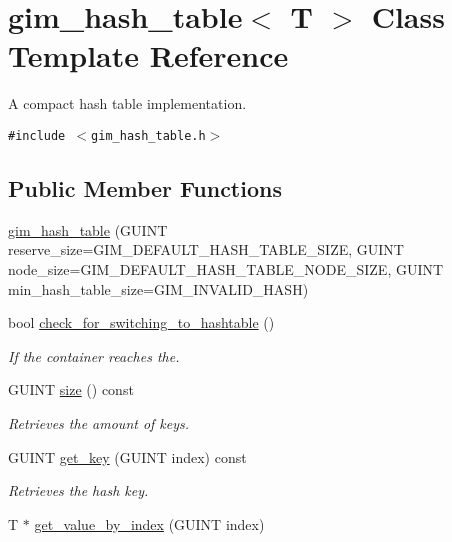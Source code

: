 \hypertarget{classgim__hash__table}{
\section{gim\_\-hash\_\-table$<$ T $>$ Class Template Reference}
\label{classgim__hash__table}
}
A compact hash table implementation.  


{\tt \#include $<$gim\_\-hash\_\-table.h$>$}

\subsection*{Public Member Functions}
\begin{CompactItemize}
\item 
\hyperlink{classgim__hash__table_efe21c907c69c8077ec0886aaa778f6f}{gim\_\-hash\_\-table} (GUINT reserve\_\-size=GIM\_\-DEFAULT\_\-HASH\_\-TABLE\_\-SIZE, GUINT node\_\-size=GIM\_\-DEFAULT\_\-HASH\_\-TABLE\_\-NODE\_\-SIZE, GUINT min\_\-hash\_\-table\_\-size=GIM\_\-INVALID\_\-HASH)
\item 
\hypertarget{classgim__hash__table_ba33eeb9b5aa00b0d8a002c549b71ed3}{
bool \hyperlink{classgim__hash__table_ba33eeb9b5aa00b0d8a002c549b71ed3}{check\_\-for\_\-switching\_\-to\_\-hashtable} ()}
\label{classgim__hash__table_ba33eeb9b5aa00b0d8a002c549b71ed3}

\begin{CompactList}\small\item\em If the container reaches the. \item\end{CompactList}\item 
\hypertarget{classgim__hash__table_a24edf41f1a5f7ee28f6d1f12e3922c3}{
GUINT \hyperlink{classgim__hash__table_a24edf41f1a5f7ee28f6d1f12e3922c3}{size} () const }
\label{classgim__hash__table_a24edf41f1a5f7ee28f6d1f12e3922c3}

\begin{CompactList}\small\item\em Retrieves the amount of keys. \item\end{CompactList}\item 
\hypertarget{classgim__hash__table_d735b8794a51eca1caee6de5bbc4cf90}{
GUINT \hyperlink{classgim__hash__table_d735b8794a51eca1caee6de5bbc4cf90}{get\_\-key} (GUINT index) const }
\label{classgim__hash__table_d735b8794a51eca1caee6de5bbc4cf90}

\begin{CompactList}\small\item\em Retrieves the hash key. \item\end{CompactList}\item 
\hypertarget{classgim__hash__table_b5ec54c3096e790e8c7ae570300df95d}{
T $\ast$ \hyperlink{classgim__hash__table_b5ec54c3096e790e8c7ae570300df95d}{get\_\-value\_\-by\_\-index} (GUINT index)}
\label{classgim__hash__table_b5ec54c3096e790e8c7ae570300df95d}


\end{CompactItemize}
